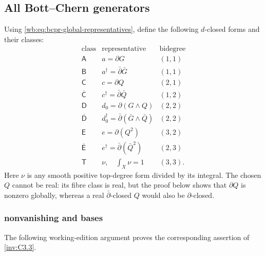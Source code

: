 \subsection{All Bott--Chern generators}

Using \cref{wb:eq:bcpr-global-representatives}, define the following
$d$-closed forms and their classes:
\begin{equation}
\begin{array}{c|c|c}
\text{class}&\text{representative}&\text{bidegree}\\ \hline
\mathsf A&a=\partial G&(1,1)\\
\mathsf B&a^\dagger=\bar\partial\bar G&(1,1)\\
\mathsf C&c=\partial Q&(2,1)\\
\overline{\mathsf C}&c^\dagger=\bar\partial\bar Q&(1,2)\\
\mathsf D&d_0=\partial(G\wedge Q)&(2,2)\\
\overline{\mathsf D}&d_0^\dagger=
 \bar\partial(\bar G\wedge\bar Q)&(2,2)\\
\mathsf E&e=\partial(Q^2)&(3,2)\\
\overline{\mathsf E}&e^\dagger=\bar\partial(\bar Q^2)&(2,3)\\
\mathsf T&\nu,\quad\int_X\nu=1&(3,3).
\end{array}
\label{wb:eq:bcpr-generators}
\end{equation}
Here $\nu$ is any smooth positive top-degree form divided by its integral.
The chosen $Q$ cannot be real: its fibre class is real, but the proof below
shows that $\partial Q$ is nonzero globally, whereas a real
$\bar\partial$-closed $Q$ would also be $\partial$-closed.

\subsubsection{nonvanishing and bases}\label{inv:wbproof:prop:bcpr-generators-are-bases}
The following working-edition argument proves the corresponding assertion of \cref{inv:C3.3}.


